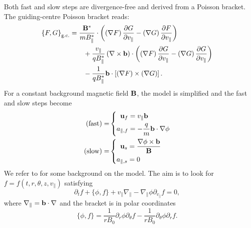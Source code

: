 Both fast and slow steps are divergence-free and derived from a Poisson bracket.\\
The guiding-centre Poisson bracket reads:
\begin{subequations}
	\begin{align}
		\left\{ F, G \right\}_{\text{g.c.}} & = \frac{\mathbf{B}^\ast}{m B_\parallel^\ast} \cdot \left( \left(\nabla F\right) \frac{\partial G}{\partial v_\parallel} - \left(\nabla G\right) \frac{\partial F}{\partial v_\parallel} \right) \label{gc Pb part 1} \\
		& \qquad + \frac{v_\parallel}{q B_\parallel^\ast} \left( \nabla \times \mathbf{b} \right) \cdot \left( \left(\nabla F\right) \frac{\partial G}{\partial v_\parallel} - \left(\nabla G\right) \frac{\partial G}{\partial v_\parallel} \right) \label{gc Pb part 2} \\
		& \qquad - \frac{1}{q B_\parallel^\ast} \mathbf{b} \cdot \left[\left(\nabla F\right) \times \left(\nabla G\right)\right]. \label{gc Pb part 3}
	\end{align}
\end{subequations}
For a constant background magnetic field $\mathbf{B}$, the model is simplified and the fast and slow steps become 
\begin{subequations}
	\begin{align}
		(\text{fast}) = & \left\{ \begin{aligned}
			\mathbf{u}_f & = {v_\parallel} \mathbf{b} \\
			a_{\parallel, f} & = -\frac{q}{m} \mathbf{b} \cdot \nabla \phi
		\end{aligned} \right. \label{split step fast const B}\\
		(\text{slow}) = &  \left\{ \begin{aligned}
			\mathbf{u}_s & = \frac{\nabla \phi\times \mathbf{b}}{\mathbf{B}}  \\
			a_{\parallel, s} & = 0
		\end{aligned} \right. \label{split step slow const B}
	\end{align}
\end{subequations}
We refer to \cite{Latu_2017} for some background on the model. The aim is to look for $f = f(t, r, \theta, z, v_\parallel)$ satisfying
\begin{equation}
\partial_t f + \{\phi, f\} + v_\parallel \nabla_\parallel - \nabla_\parallel \phi \partial_{v_\parallel}f = 0, \label{eq:GK_model}
\end{equation}
where $\nabla_\parallel = \mathbf{b} \cdot \nabla$ and the bracket is in polar coordinates
\begin{equation}
\{\phi, f \} = \frac{1}{rB_0}\partial_r \phi\partial_\theta f -\frac{1}{rB_0}\partial_\theta \phi\partial_r f. \label{eq:bracket_in_polar}
\end{equation}
